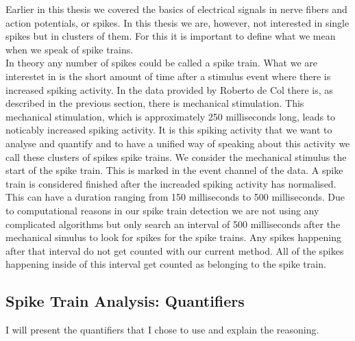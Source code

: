Earlier in this thesis we covered the basics of electrical signals in nerve fibers and action potentials, or spikes. In this thesis we are, however, not interested in single spikes but in clusters of them. For this it is important to define what we mean when we speak of spike trains.\\
In theory any number of spikes could be called a spike train. What we are interestet in is the short amount of time after a stimulus event where there is increased spiking activity. In the data provided by Roberto de Col there is, as described in the previous section, there is mechanical stimulation. This mechanical stimulation, which is approximately 250 milliseconds long, leads to noticably increased spiking activity. It is this spiking activity that we want to analyse and quantify and to have a unified way of speaking about this activity we call these clusters of spikes spike trains. We consider the mechanical stimulus the start of the spike train. This is marked in the event channel of the data. A spike train is considered finished after the increaded spiking activity has normalised. This can have a duration ranging from 150 milliseconds to 500 milliseconds. Due to computational reasons in our spike train detection we are not using any complicated algorithms but only search an interval of 500 milliseconds after the mechanical simulus to look for spikes for the spike trains. Any spikes happening after that interval do not get counted with our current method. All of the spikes happening inside of this interval get counted as belonging to the spike train.


\subsection{Spike Train Analysis: Quantifiers}
I will present the quantifiers that I chose to use and explain the reasoning.

